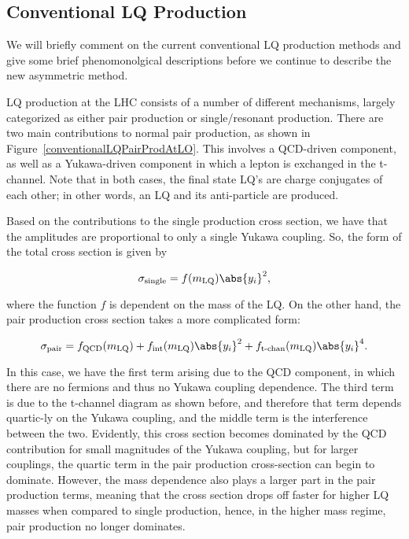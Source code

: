     \subsection{Conventional LQ Production}
        We will briefly comment on the current conventional LQ production methods and give some brief phenomonolgical descriptions before we continue to describe the new asymmetric method. 
        
        LQ production at the LHC consists of a number of different mechanisms, largely categorized as either pair production or single/resonant production. There are two main contributions to normal pair production, as shown in Figure~\ref{conventionalLQPairProdAtLO}. This involves a QCD-driven component, as well as a Yukawa-driven component in which a lepton is exchanged in the t-channel. Note that in both cases, the final state LQ's are charge conjugates of each other; in other words, an LQ and its anti-particle are produced. 
        
        
        Based on the contributions to the single production cross section, we have that the amplitudes are proportional to only a single Yukawa coupling. So, the form of the total cross section is given by

        \begin{equation}
            \sigma_{\text{single}} = f(m_{\text{LQ}}) \abs{y_i}^2,
        \end{equation}

        where the function $f$ is dependent on the mass of the LQ. On the other hand, the pair production cross section takes a more complicated form:

        \begin{equation}
            \sigma_{\text{pair}} = f_{\text{QCD}}(m_{\text{LQ}}) + f_{\text{int}}(m_{\text{LQ}}) \abs{y_i}^2 + f_{\text{t-chan}}(m_{\text{LQ}}) \abs{y_i}^4. 
        \end{equation}

        In this case, we have the first term arising due to the QCD component, in which there are no fermions and thus no Yukawa coupling dependence. The third term is due to the t-channel diagram as shown before, and therefore that term depends quartic-ly on the Yukawa coupling, and the middle term is the interference between the two. Evidently, this cross section becomes dominated by the QCD contribution for small magnitudes of the Yukawa coupling, but for larger couplings, the quartic term in the pair production cross-section can begin to dominate. However, the mass dependence also plays a larger part in the pair production terms, meaning that the cross section drops off faster for higher LQ masses when compared to single production, hence, in the higher mass regime, pair production no longer dominates. 
